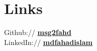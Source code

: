 \documentclass[]{deedy-resume-reversed}
\begin{document}
\begin{minipage}[t]{0.33\textwidth}


\section{Links}
Github:// \href{https://github.com/msg2fahd}{\bf msg2fahd} \\
LinkedIn://  \href{https://www.linkedin.com/in/mdfahadislam/}{\bf mdfahadislam} \\
\sectionsep



\end{minipage}
\end{document}
